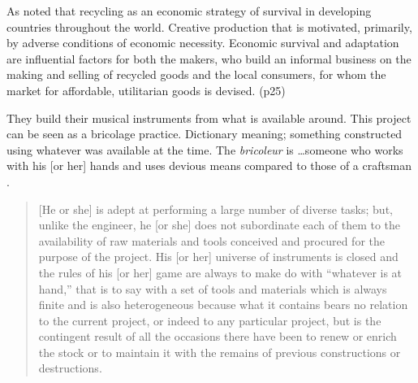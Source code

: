As noted that recycling as an economic strategy of survival in developing countries throughout the world. Creative production that is motivated, primarily, by adverse conditions of economic necessity. Economic survival and adaptation are influential factors for both the makers, who build an informal business on the making and selling of recycled goods and the local consumers, for whom the market for affordable, utilitarian goods is devised. (p25)

They build their musical instruments from what is available around. This project can be seen as a bricolage practice. Dictionary meaning; something constructed using whatever was available at the time.  The \textit{bricoleur} is \ldots someone who works with his [or her] hands and uses devious means compared to those of a craftsman \citep{levi1966savage}.


\begin{quote}
[He or she] is adept at performing a large number of diverse tasks; but, unlike the engineer, he [or she] does not subordinate each of them to the availability of raw materials and tools conceived and procured for the purpose of the project. His [or her] universe of instruments is closed and the rules of his [or her] game are always to make do with “whatever is at hand,” that is to say with a set of tools and materials which is always finite and is also heterogeneous because what it contains bears no relation to the current project, or indeed to any particular project, but is the contingent result of all the occasions there have been to renew or enrich the stock or to maintain it with the remains of previous constructions or destructions.\cite{levi1966savage}
\end{quote}


